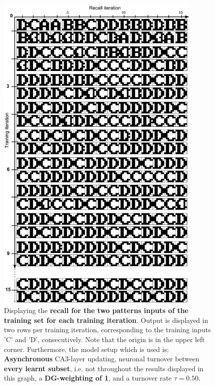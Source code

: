 \begin{figure}
    \centering
    \includegraphics[width=10cm]{fig/CD-pattern-associations-async-tm0-dgw1-tau050}
    \caption{Displaying the \textbf{recall for the two patterns inputs of the training set for each training iteration}. Output is displayed in two rows per training iteration, corresponding to the training inputs 'C' and 'D', consecutively. Note that the origin is in the upper left corner. Furthermore, the model setup which is used is: \textbf{Asynchronous} CA3-layer updating, neuronal turnover between \textbf{every learnt subset}, i.e. not throughout the results displayed in this graph, a \textbf{DG-weighting of 1}, and a turnover rate $\tau=0.50$.}
    \label{fig:low-level-demo-async-tm0-dgw1}
\end{figure}

